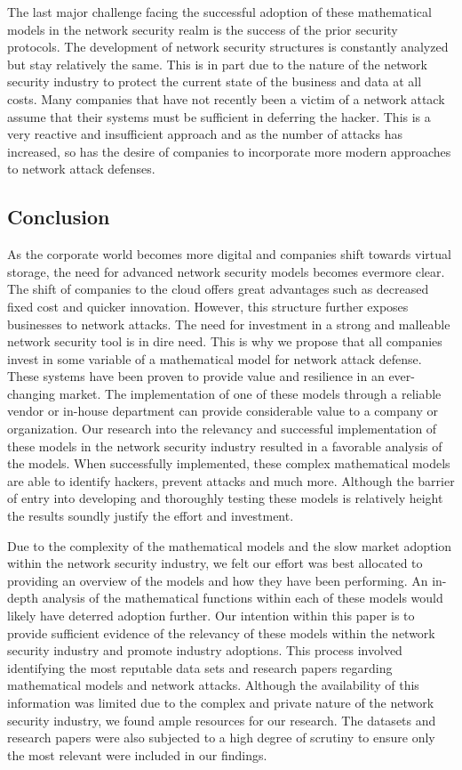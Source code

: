 \documentclass{article}
\begin{document}
The last major challenge facing the successful adoption of these mathematical models in the network security realm is the success of the prior security protocols. The development of network security structures is constantly analyzed but stay relatively the same. This is in part due to the nature of the network security industry to protect the current state of the business and data at all costs. Many companies that have not recently been a victim of a network attack assume that their systems must be sufficient in deferring the hacker. This is a very reactive and insufficient approach and as the number of attacks has increased, so has the desire of companies to incorporate more modern approaches to network attack defenses. 

\subsection{Conclusion}
As the corporate world becomes more digital and companies shift towards virtual storage, the need for advanced network security models becomes evermore clear. The shift of companies to the cloud offers great advantages such as decreased fixed cost and quicker innovation. However, this structure further exposes businesses to network attacks. The need for investment in a strong and malleable network security tool is in dire need. This is why we propose that all companies invest in some variable of a mathematical model for network attack defense. These systems have been proven to provide value and resilience in an ever-changing market. The implementation of one of these models through a reliable vendor or in-house department can provide considerable value to a company or organization. Our research into the relevancy and successful implementation of these models in the network security industry resulted in a favorable analysis of the models. When successfully implemented, these complex mathematical models are able to identify hackers, prevent attacks and much more. Although the barrier of entry into developing and thoroughly testing these models is relatively height the results soundly justify the effort and investment. 

Due to the complexity of the mathematical models and the slow market adoption within the network security industry, we felt our effort was best allocated to providing an overview of the models and how they have been performing. An in-depth analysis of the mathematical functions within each of these models would likely have deterred adoption further. Our intention within this paper is to provide sufficient evidence of the relevancy of these models within the network security industry and promote industry adoptions. This process involved identifying the most reputable data sets and research papers regarding mathematical models and network attacks. Although the availability of this information was limited due to the complex and private nature of the network security industry, we found ample resources for our research. The datasets and research papers were also subjected to a high degree of scrutiny to ensure only the most relevant were included in our findings. 
\end{document}
